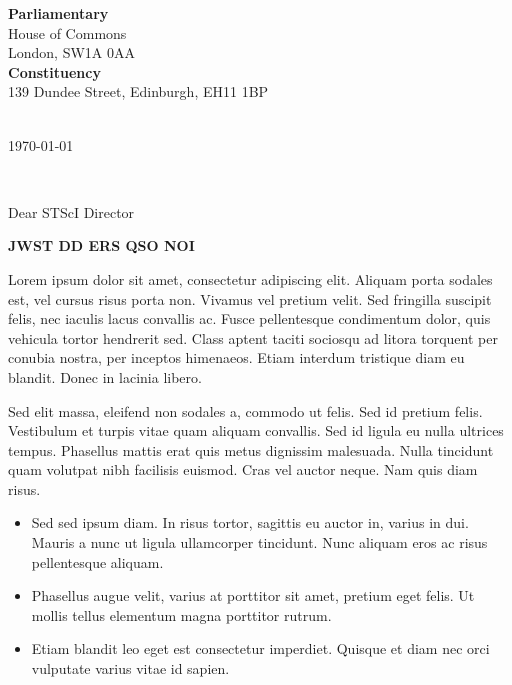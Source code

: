 \documentclass[11pt,a4paper]{letter} %
\def\opening#1{\thispagestyle{empty}
{\centering\fromaddress \vspace{0.6in} \\ %
\hspace*{\longindentation}\today\hspace*{\fill}\par} %
{\raggedright \toname \\ \toaddress \par} %
\vspace{0.4in} %
\noindent #1 %
}
\begin{document}

\begin{letter}
{{\bf Parliamentary}\\
House of Commons \\
London, SW1A 0AA \\
{\bf Constituency} \\
139 Dundee Street, 
Edinburgh, EH11 1BP\\
}



\opening{Dear STScI Director}

\smallskip

{\bf JWST DD ERS QSO NOI}

 Lorem ipsum dolor sit amet, consectetur adipiscing elit. Aliquam porta sodales est, vel cursus risus porta non. Vivamus vel pretium velit. Sed fringilla suscipit felis, nec iaculis lacus convallis ac. Fusce pellentesque condimentum dolor, quis vehicula tortor hendrerit sed. Class aptent taciti sociosqu ad litora torquent per conubia nostra, per inceptos himenaeos. Etiam interdum tristique diam eu blandit. Donec in lacinia libero.

Sed elit massa, eleifend non sodales a, commodo ut felis. Sed id pretium felis. Vestibulum et turpis vitae quam aliquam convallis. Sed id ligula eu nulla ultrices tempus. Phasellus mattis erat quis metus dignissim malesuada. Nulla tincidunt quam volutpat nibh facilisis euismod. Cras vel auctor neque. Nam quis diam risus.

\begin{itemize}
\item{Sed sed ipsum diam. In risus tortor, sagittis eu auctor in,
    varius in dui. Mauris a nunc ut ligula ullamcorper tincidunt. Nunc
    aliquam eros ac risus pellentesque aliquam.} 
  \item{Phasellus augue velit, varius at porttitor sit amet, pretium eget felis. Ut mollis tellus elementum magna porttitor rutrum.}
\item{Etiam blandit leo eget est consectetur imperdiet. Quisque et diam nec orci vulputate varius vitae id sapien.}
\end{itemize}


\end{letter}
\end{document}
